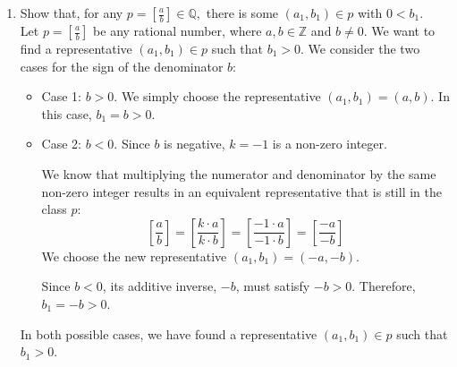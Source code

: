 \documentclass[11pt]{article}
\begin{document}
\begin{enumerate}
\begin{proof}
\begin{itemize}
    \end{itemize}
Thus, $\mathbb{Z}$ with the ordering $<$ satisfies Axiom 2. \\
\textbf{Axiom 3:} We will show that $\mathbb{Z}$ with the ordering $<$ has no first or last point, and we will prove this by contradiction.\\
\textit{No last point:} Suppose that k is the last point of $\mathbb{Z}$. Take $1 \in \mathbb{N}$. Then by the ordering, $k + 1 \in \mathbb{Z}$ and $k < k + 1$. This contradicts our assumption that $k$ is the last point of $\mathbb{Z}$. Thus, $\mathbb{Z}$ has no last point. \\
\textit{No first point:} Suppose that k is the first point of $\mathbb{Z}$. Take $1 \in \mathbb{N}$. Then by the ordering, $k - 1 \in \mathbb{Z}$ and $k - 1 < k$. This contradicts our assumption that $k$ is the first point of $\mathbb{Z}$. Thus, $\mathbb{Z}$ has no first point.

Since we have show that $\mathbb{Z}$ with the ordering $<$ satisfies Axioms 1-3, we conclude the proof.
\end{proof}

\item[b)] Show that, for any $p=\left[\frac{a}{b}\right]\in\mathbb{Q},$ there is some $(a_1,b_1)\in p$ with $0<b_1.$
\\Let $p = \left[\frac{a}{b}\right]$ be any rational number, where $a, b \in \mathbb{Z}$ and $b \neq 0$. We want to find a representative $(a_1, b_1) \in p$ such that $b_1 > 0$. We consider the two cases for the sign of the denominator $b$:
    
    \begin{itemize}
        \item Case 1: $b > 0$.
        We simply choose the representative $(a_1, b_1) = (a, b)$. In this case, $b_1 = b > 0$.
        
        \item Case 2: $b < 0$.
        Since $b$ is negative, $k = -1$ is a non-zero integer.
        
        We know that multiplying the numerator and denominator by the same non-zero integer results in an equivalent representative that is still in the class $p$:
        \[
        \left[\frac{a}{b}\right] = \left[\frac{k \cdot a}{k \cdot b}\right] = \left[\frac{-1 \cdot a}{-1 \cdot b}\right] = \left[\frac{-a}{-b}\right]
        \]
        We choose the new representative $(a_1, b_1) = (-a, -b)$.
        
        Since $b < 0$, its additive inverse, $-b$, must satisfy $-b > 0$.
        Therefore, $b_1 = -b > 0$.
    \end{itemize}
    In both possible cases, we have found a representative $(a_1, b_1) \in p$ such that $b_1 > 0$.


\end{enumerate}
\end{document}
